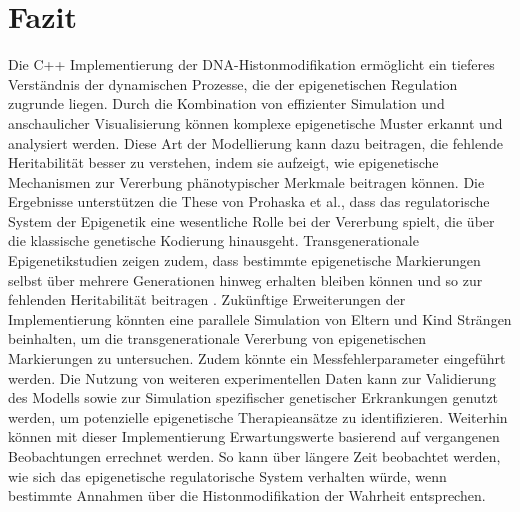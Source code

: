 \documentclass{SeminarV2}
\begin{document}
\section{Fazit}
Die C++ Implementierung der DNA-Histonmodifikation erm\"{o}glicht ein tieferes Verst\"{a}ndnis der dynamischen Prozesse, die der epigenetischen Regulation zugrunde liegen. Durch die Kombination von effizienter Simulation und anschaulicher Visualisierung k\"{o}nnen komplexe epigenetische Muster erkannt und analysiert werden.
Diese Art der Modellierung kann dazu beitragen, die fehlende Heritabilit\"{a}t besser zu verstehen, indem sie aufzeigt, wie epigenetische Mechanismen zur Vererbung ph\"{a}notypischer Merkmale beitragen k\"{o}nnen. Die Ergebnisse unterst\"{u}tzen die These von Prohaska et al., dass das regulatorische System der Epigenetik eine wesentliche Rolle bei der Vererbung spielt, die \"{u}ber die klassische genetische Kodierung hinausgeht.
Transgenerationale Epigenetikstudien zeigen zudem, dass bestimmte epigenetische Markierungen selbst \"{u}ber mehrere Generationen hinweg erhalten bleiben k\"{o}nnen und so zur fehlenden Heritabilit\"{a}t beitragen \cite{tollefsbol-2014}.
Zuk\"{u}nftige Erweiterungen der Implementierung k\"{o}nnten eine parallele Simulation von Eltern und Kind Str\"{a}ngen beinhalten, um die transgenerationale Vererbung von epigenetischen Markierungen zu untersuchen.
Zudem könnte ein Messfehlerparameter eingeführt werden.
Die Nutzung von weiteren experimentellen Daten kann zur Validierung des Modells sowie zur Simulation spezifischer genetischer Erkrankungen genutzt werden, um potenzielle epigenetische Therapieans\"{a}tze zu identifizieren.
Weiterhin können mit dieser Implementierung Erwartungswerte basierend auf vergangenen Beobachtungen errechnet werden. So kann \"{u}ber l\"{a}ngere Zeit beobachtet werden, wie sich das epigenetische regulatorische System verhalten w\"{u}rde, wenn bestimmte Annahmen \"{u}ber die Histonmodifikation der Wahrheit entsprechen.

\begin{footnotesize}
\newpage


\end{footnotesize}
\end{document}
